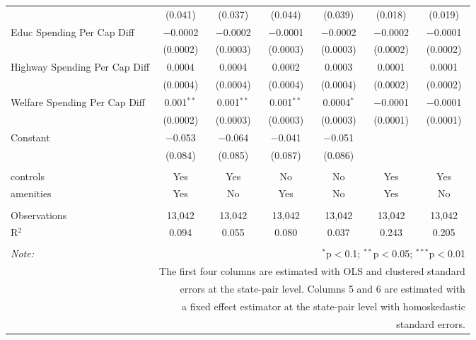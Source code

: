 \begin{table}[!htbp]
\begin{tabular}{@{\extracolsep{5pt}}lcccccc}
  & (0.041) & (0.037) & (0.044) & (0.039) & (0.018) & (0.019) \\ 
  Educ Spending Per Cap Diff & $-$0.0002 & $-$0.0002 & $-$0.0001 & $-$0.0002 & $-$0.0002 & $-$0.0001 \\ 
  & (0.0002) & (0.0003) & (0.0003) & (0.0003) & (0.0002) & (0.0002) \\ 
  Highway Spending Per Cap Diff & 0.0004 & 0.0004 & 0.0002 & 0.0003 & 0.0001 & 0.0001 \\ 
  & (0.0004) & (0.0004) & (0.0004) & (0.0004) & (0.0002) & (0.0002) \\ 
  Welfare Spending Per Cap Diff & 0.001$^{**}$ & 0.001$^{**}$ & 0.001$^{**}$ & 0.0004$^{*}$ & $-$0.0001 & $-$0.0001 \\ 
  & (0.0002) & (0.0003) & (0.0003) & (0.0003) & (0.0001) & (0.0001) \\ 
  Constant & $-$0.053 & $-$0.064 & $-$0.041 & $-$0.051 &  &  \\ 
  & (0.084) & (0.085) & (0.087) & (0.086) &  &  \\ 
 \hline \\[-1.8ex] 
controls & Yes & Yes & No & No & Yes & Yes \\ 
amenities & Yes & No & Yes & No & Yes & No \\ 
\hline \\[-1.8ex] 
Observations & 13,042 & 13,042 & 13,042 & 13,042 & 13,042 & 13,042 \\ 
R$^{2}$ & 0.094 & 0.055 & 0.080 & 0.037 & 0.243 & 0.205 \\ 
\hline 
\hline \\[-1.8ex] 
\textit{Note:}  & \multicolumn{6}{r}{$^{*}$p$<$0.1; $^{**}$p$<$0.05; $^{***}$p$<$0.01} \\ 
 & \multicolumn{6}{r}{The first four columns are estimated with OLS and clustered standard} \\ 
 & \multicolumn{6}{r}{ errors at the state-pair level. Columns 5 and 6 are estimated with} \\ 
 & \multicolumn{6}{r}{a fixed effect estimator at the state-pair level with homoskedastic} \\ 
 & \multicolumn{6}{r}{standard errors.} \\ 
\end{tabular} 
\end{table} 
